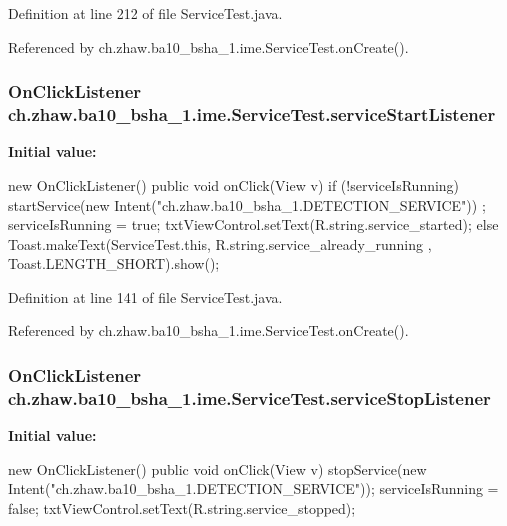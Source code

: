 Definition at line 212 of file ServiceTest.java.

Referenced by ch.zhaw.ba10\_\-bsha\_\-1.ime.ServiceTest.onCreate().\hypertarget{classch_1_1zhaw_1_1ba10__bsha__1_1_1ime_1_1ServiceTest_ac61c2027977621a45d5b68999adb3df0}{
\subsubsection[{serviceStartListener}]{\setlength{\rightskip}{0pt plus 5cm}OnClickListener {\bf ch.zhaw.ba10\_\-bsha\_\-1.ime.ServiceTest.serviceStartListener}}}
\label{classch_1_1zhaw_1_1ba10__bsha__1_1_1ime_1_1ServiceTest_ac61c2027977621a45d5b68999adb3df0}
{\bfseries Initial value:}
\begin{DoxyCode}
 new OnClickListener() {
        public void onClick(View v) {
            if (!serviceIsRunning) {
                startService(new Intent("ch.zhaw.ba10_bsha_1.DETECTION_SERVICE"))
      ;
                serviceIsRunning = true;
                txtViewControl.setText(R.string.service_started);
            } else {
                Toast.makeText(ServiceTest.this, R.string.service_already_running
      , Toast.LENGTH_SHORT).show();
            }
        }
    }
\end{DoxyCode}


Definition at line 141 of file ServiceTest.java.

Referenced by ch.zhaw.ba10\_\-bsha\_\-1.ime.ServiceTest.onCreate().\hypertarget{classch_1_1zhaw_1_1ba10__bsha__1_1_1ime_1_1ServiceTest_acf699219d38a24ed7f4de7985cbcb129}{
\subsubsection[{serviceStopListener}]{\setlength{\rightskip}{0pt plus 5cm}OnClickListener {\bf ch.zhaw.ba10\_\-bsha\_\-1.ime.ServiceTest.serviceStopListener}}}
\label{classch_1_1zhaw_1_1ba10__bsha__1_1_1ime_1_1ServiceTest_acf699219d38a24ed7f4de7985cbcb129}
{\bfseries Initial value:}
\begin{DoxyCode}
 new OnClickListener() {
        public void onClick(View v) {
            stopService(new Intent("ch.zhaw.ba10_bsha_1.DETECTION_SERVICE"));
            serviceIsRunning = false;
                txtViewControl.setText(R.string.service_stopped);
        }
    }
\end{DoxyCode}


